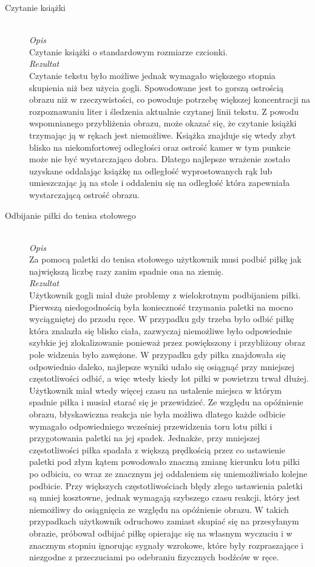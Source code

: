 \documentclass[a4paper,11pt,twoside]{report}
\theoremstyle{definition}
\begin{document}
\begin{description}
\item[Czytanie książki] \hfill \\
\textit{Opis} \\
Czytanie książki o standardowym rozmiarze czcionki. \\
\textit{Rezultat} \\
Czytanie tekstu było możliwe jednak wymagało większego stopnia skupienia niż bez użycia gogli. Spowodowane jest to gorszą ostrością obrazu niż w rzeczywistości, co powoduje potrzebę większej koncentracji na rozpoznawaniu liter i śledzenia aktualnie czytanej linii tekstu. Z powodu wspomnianego przybliżenia obrazu, może okazać się, że czytanie książki trzymając ją w rękach jest niemożliwe. Książka znajduje się wtedy zbyt blisko na niekomfortowej odległości oraz ostrość kamer w tym punkcie może nie być wystarczająco dobra. Dlatego najlepsze wrażenie zostało uzyskane oddalając książkę na odległość wyprostowanych rąk lub umieszczając ją na stole i oddaleniu się na odległość która zapewniała wystarczającą ostrość obrazu.    

\item[Odbijanie piłki do tenisa stołowego] \hfill \\
\textit{Opis} \\
 Za pomocą paletki do tenisa stołowego użytkownik musi podbić piłkę jak największą liczbę razy zanim spadnie ona na ziemię. \\
\textit{Rezultat}\\
Użytkownik gogli miał duże problemy z wielokrotnym podbijaniem piłki. Pierwszą niedogodnością była konieczność trzymania paletki na mocno wyciągniętej do przodu ręce. W przypadku gdy trzeba było odbić piłkę która znalazła się blisko ciała, zazwyczaj niemożliwe było odpowiednie szybkie jej zlokalizowanie ponieważ przez powiększony i przybliżony obraz pole widzenia było zawężone. W przypadku gdy piłka znajdowała się odpowiednio daleko, najlepsze wyniki udało się osiągnąć przy mniejszej częstotliwości odbić, a więc wtedy kiedy lot piłki w powietrzu trwał dłużej. Użytkownik miał wtedy więcej czasu na ustalenie miejsca w którym spadnie piłka i musiał starać się je przewidzieć. Ze względu na opóźnienie obrazu, błyskawiczna reakcja nie była możliwa dlatego każde odbicie wymagało odpowiedniego wcześniej przewidzenia toru lotu piłki  i przygotowania paletki na jej spadek. Jednakże, przy mniejszej częstotliwości piłka spadała z większą prędkością przez co ustawienie paletki pod złym kątem powodowało znaczną zmianę kierunku lotu piłki po odbiciu, co wraz ze znacznym jej oddaleniem się uniemożliwiało kolejne podbicie. Przy większych częstotliwościach błędy złego ustawienia paletki są mniej kosztowne, jednak wymagają szybszego czasu reakcji, który jest niemożliwy do osiągnięcia ze względu na opóźnienie obrazu. W takich przypadkach użytkownik odruchowo zamiast skupiać się na przesyłanym obrazie, próbował odbijać piłkę opierając się na własnym wyczuciu i w znacznym stopniu ignorując sygnały wzrokowe, które były rozpraszające i niezgodne z przeczuciami po odebraniu fizycznych bodźców w ręce. 


\end{description}
\end{document}
